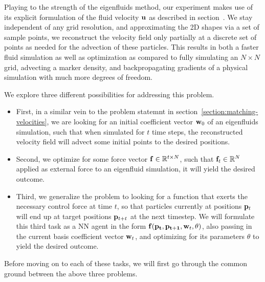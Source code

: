 Playing to the strength of the eigenfluids method, our experiment makes use of
its explicit formulation of the fluid velocity $\vb{u}$ as described in
section~. We stay independent of any grid resolution, and
approximating the 2D shapes via a set of sample points, we reconstruct the
velocity field only partially at a discrete set of points as needed for the
advection of these particles. This results in both a faster fluid simulation as
well as optimization as compared to fully simulating an $N\times N$ grid,
advecting a marker density, and backpropagating gradients of a physical
simulation with much more degrees of freedom.

We explore three different possibilities for addressing this problem. 
\begin{itemize}
  \item First, in a similar vein to the problem statemnt in
    section~\ref{section:matching-velocities}, we are looking for an initial
    coefficient vector $\vb{w}_0$ of an eigenfluids simulation, such that when
    simulated for $t$ time steps, the reconstructed velocity field will advect
    some initial points to the desired positions.
  \item Second, we optimize for some force vector $\vb{f}\in \mathbb{R}^{t\times
    N}$, such that $\vb{f}_t \in \mathbb{R}^N$ applied as external force to an
    eigenfluid simulation, it will yield the desired outcome.
  \item Third, we generalize the problem to looking for a function that exerts
    the necessary control force at time $t$, so that particles currently at
    positions $\vb{p}_t$ will end up at target positions $\vb{p}_{t+t}$ at the
    next timestep. We will formulate this third task as a \acf{NN}
    agent in the form $\vb{f}(\vb{p_t}, \vb{p_{t+1}}, \vb{w}_{t}, \vb{\theta})$,
    also passing in the current basis coefficient vector $\vb{w}_t$, and
    optimizing for its parameters $\theta$ to yield the desired outcome.
\end{itemize}

Before moving on to each of these tasks, we will first go through the common
ground between the above three problems.

